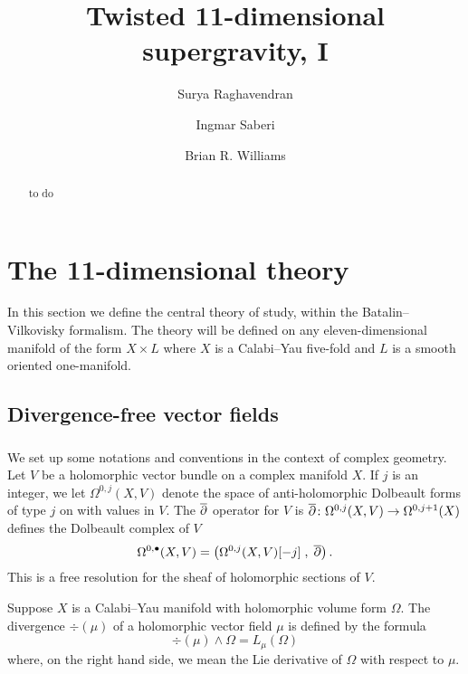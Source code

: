 \documentclass[11pt]{amsart}
\begin{document}
\title{Twisted 11-dimensional supergravity, I}
\author{Surya Raghavendran}
\address{Perimeter Institute}
\author{Ingmar Saberi}
\address{Ludwig-Maximilians-Universit\"at M\"unchen \\ Fakult\"at f\"ur Physik \\ Theresienstra\ss{}e 37 \\ 80333 M\"unchen \\ Deutschland}
\author{Brian R. Williams}
\address{School of Mathematics, University of Edinburgh, Edinburgh, UK}
\begin{abstract}
to do
\end{abstract}
\maketitle

\section{The 11-dimensional theory} 

In this section we define the central theory of study, within the Batalin--Vilkovisky formalism.
The theory will be defined on any eleven-dimensional manifold of the form $X \times L$ where $X$ is a Calabi--Yau five-fold and $L$ is a smooth oriented one-manifold.

\subsection{Divergence-free vector fields} 

\subsubsection{}
\label{sec:divfree}
We set up some notations and conventions in the context of complex geometry. 
Let $V$ be a holomorphic vector bundle on a complex manifold $X$. 
If $j$ is an integer, we let $\Omega^{0,j}(X, V)$ denote the space of anti-holomorphic Dolbeault forms of type $j$ on with values in $V$.
The $\overline{\partial}$ operator for $V$ is $\overline{\partial} \colon \Omega^{0,j}(X, V)\to \Omega^{0,j+1}(X)$ defines the Dolbeault complex of $V$
\[
  \Omega^{0,\bullet}(X, V) = \left(\Omega^{0,j}(X, V)[-j] \; , \; \overline{\partial}\right) .
\]
This is a free resolution for the sheaf of holomorphic sections of $V$.

Suppose $X$ is a Calabi--Yau manifold with holomorphic volume form $\Omega$.
The divergence $\div(\mu)$ of a holomorphic vector field $\mu$ is defined by the formula
\[
\div (\mu) \wedge \Omega = L_\mu (\Omega)
\]
where, on the right hand side, we mean the Lie derivative of $\Omega$ with respect to $\mu$.
\end{document}
